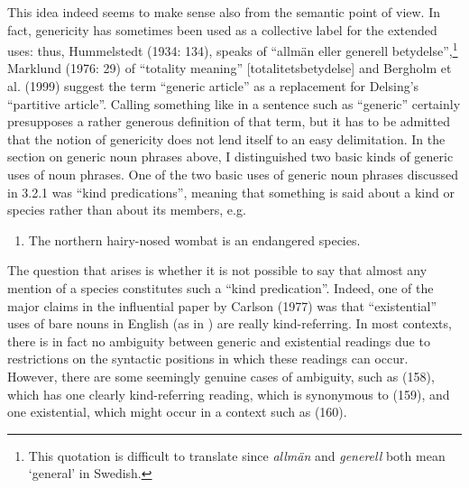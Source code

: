 This idea indeed seems to make sense also from the semantic point of view. In fact, genericity has sometimes been used as a collective label for the extended uses: thus, Hummelstedt (1934: 134), speaks of “allmän eller generell betydelse”,\footnote{ This quotation is difficult to translate since \textit{allmän} and \textit{generell} both mean ‘general’ in Swedish.} Marklund (1976: 29) of “totality meaning” [totalitetsbetydelse] and Bergholm et al. (1999) suggest the term “generic article” as a replacement for Delsing’s “partitive article”. Calling something like  in a sentence such as  “generic” certainly presupposes a rather generous definition of that term, but it has to be admitted that the notion of genericity does not lend itself to an easy delimitation. In the section on generic noun phrases above, I distinguished two basic kinds of generic uses of noun phrases. One of the two basic uses of generic noun phrases discussed in 3.2.1 was “kind predications”, meaning that something is said about a kind or species rather than about its members, e.g. 

\begin{enumerate} %
\item 
The northern hairy-nosed wombat is an endangered species. 

\end{enumerate} %
The question that arises is whether it is not possible to say that almost any mention of a species constitutes such a “kind predication”. Indeed, one of the major claims in the influential paper by Carlson (1977) was that “existential” uses of bare nouns in English (as in ) are really kind-referring. In most contexts, there is in fact no ambiguity between generic and existential readings due to restrictions on the syntactic positions in which these readings can occur. However, there are some seemingly genuine cases of ambiguity, such as (158), which has one clearly kind-referring reading, which is synonymous to (159), and one existential, which might occur in a context such as (160).

